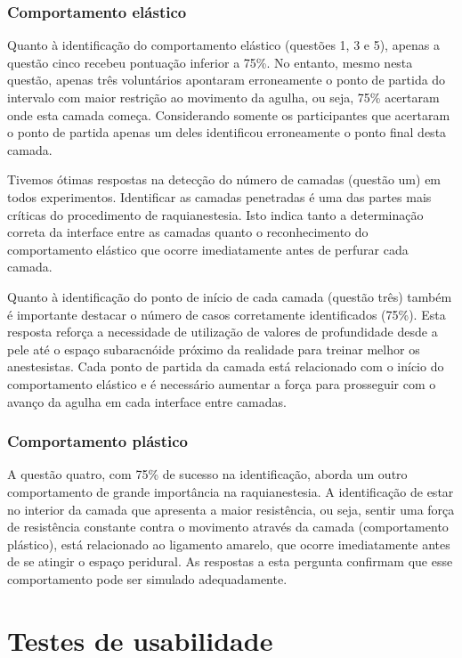\subsubsection{Comportamento elástico}

Quanto à identificação do comportamento elástico (questões 1, 3 e 5), apenas a questão cinco recebeu pontuação inferior a 75\%. No entanto, mesmo nesta questão, apenas três voluntários apontaram erroneamente o ponto de partida do intervalo com maior restrição ao movimento da agulha, ou seja, 75\% acertaram onde esta camada começa. Considerando somente os participantes que acertaram o ponto de partida apenas um deles identificou erroneamente o ponto final desta camada. 

Tivemos ótimas respostas na detecção do número de camadas (questão um) em todos experimentos. Identificar as camadas penetradas é uma das partes mais críticas do procedimento de raquianestesia. Isto indica tanto a determinação correta  da interface entre as camadas quanto o reconhecimento do comportamento elástico que ocorre imediatamente antes de perfurar cada camada.

Quanto à identificação do ponto de início de cada camada (questão três) também é importante destacar o número de casos corretamente identificados (75\%). Esta resposta reforça a necessidade de utilização de valores de profundidade desde a pele até o espaço subaracnóide próximo da realidade para treinar melhor os anestesistas. Cada ponto de partida da camada está relacionado com o início do comportamento elástico e é necessário aumentar a força para prosseguir com o avanço da agulha em cada interface entre camadas. 

\subsubsection{Comportamento plástico}

A questão quatro, com 75\% de sucesso na identificação, aborda um outro comportamento de grande importância na raquianestesia. A identificação de estar no interior da camada que apresenta a maior
resistência, ou seja, sentir uma força de resistência constante contra o movimento através da camada (comportamento plástico), está relacionado ao ligamento amarelo, que ocorre imediatamente antes de se atingir o espaço peridural. As respostas a esta pergunta
confirmam que esse comportamento pode ser simulado adequadamente.

\section{Testes de usabilidade}
\label{sec:testeUsabilidade}

